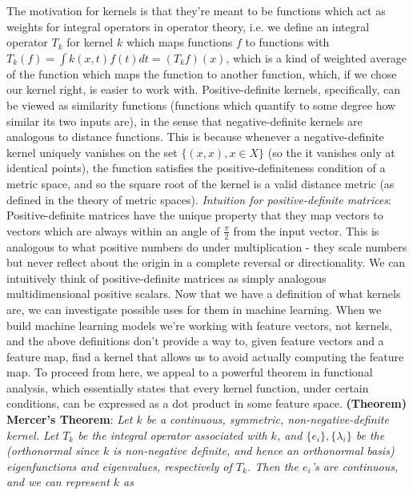 \newline
\indent The motivation for kernels is that they're meant to be functions which act as weights for integral operators in operator theory, i.e. we define an integral operator $ T_k $ for kernel $ k $ which maps functions $ f $ to functions with $ T_k(f) = \int k(x, t) f(t) dt = (T_k f)(x) $, which is a kind of weighted average of the function which maps the function to another function, which, if we chose our kernel right, is easier to work with. Positive-definite kernels, specifically, can be viewed as similarity functions (functions which quantify to some degree how similar its two inputs are), in the sense that negative-definite kernels are analogous to distance functions. This is because whenever a negative-definite kernel uniquely vanishes on the set $ \{ (x, x), x \in X \} $ (so the it vanishes only at identical points), the function satisfies the positive-definiteness condition of a metric space, and so the square root of the kernel is a valid distance metric (as defined in the theory of metric spaces).
\newline
\indent \textit{Intuition for positive-definite matrices}: Positive-definite matrices have the unique property that they map vectors to vectors which are always within an angle of $ \frac{\pi}{2} $ from the input vector. This is analogous to what positive numbers do under multiplication - they scale numbers but never reflect about the origin in a complete reversal or directionality. We can intuitively think of positive-definite matrices as simply analogous multidimensional positive scalars. 
\newline \newline
Now that we have a definition of what kernels are, we can investigate possible uses for them in machine learning. When we build machine learning models we're working with feature vectors, not kernels, and the above definitions don't provide a way to, given feature vectors and a feature map, find a kernel that allows us to avoid actually computing the feature map. To proceed from here, we appeal to a powerful theorem in functional analysis, which essentially states that every kernel function, under certain conditions, can be expressed as a dot product in some feature space.
\newline \newline
\textbf{(Theorem) Mercer's Theorem}: \textit{Let $ k $ be a continuous, symmetric, non-negative-definite kernel. Let $ T_k $ be the integral operator associated with $ k $, and $ \{ e_i \}, \{ \lambda_i \} $ be the (orthonormal since $ k $ is non-negative definite, and hence an orthonormal basis) eigenfunctions and eigenvalues, respectively of $ T_k $. Then the $ e_i $'s are continuous, and we can represent $ k $ as}
